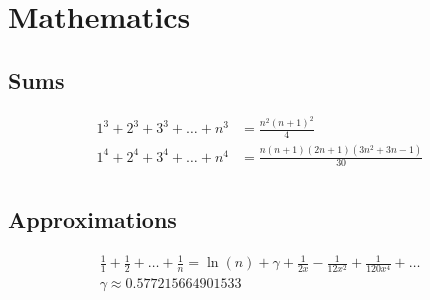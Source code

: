 
\chapter{Mathematics}

\section{Sums}
\begin{align*}
	1^3 + 2^3 + 3^3 + \dots + n^3 &= \frac{n^2(n+1)^2}{4} \\
	1^4 + 2^4 + 3^4 + \dots + n^4 &= \frac{n(n+1)(2n+1)(3n^2 + 3n - 1)}{30} \\
\end{align*}
\section{Approximations}
\begin{align*}
	\frac{1}{1}+\frac{1}{2}+\dots+\frac{1}{n} = \ln(n) + \gamma + \frac{1}{2x} - \frac{1}{12x^2} + \frac{1}{120x^4} + \dots \\
	\gamma \approx 0.577215664901533
\end{align*}
